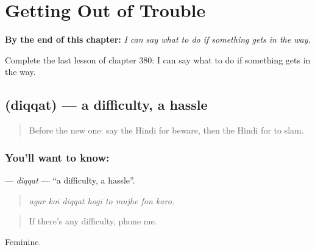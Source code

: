 
\chapter{Getting Out of Trouble}
\label{ch:hi-getting-out-of-trouble}

\begin{chapteropening}
\textbf{By the end of this chapter:} \emph{I can say what to do if something gets in the way.}

Complete the last lesson of chapter 380: I can say what to do if something gets in the way.
\end{chapteropening}

\section[\texorpdfstring{\hi{दिक़्क़त} (diqqat)}{दिक़्क़त (diqqat)}]{ (diqqat) — a difficulty, a hassle}

\label{lesson:HI-C380-diqqat}



\begin{quote}
Before the new one: say the Hindi for beware, then the Hindi for to slam.
\end{quote}

\subsection*{You'll want to know: }
\textbf{} — \emph{diqqat} — \textquotedblleft{}a difficulty, a hassle\textquotedblright{}.

\begin{quote}
       
\end{quote}

\begin{quote}
\emph{agar koī diqqat hogī to mujhe fon karo.}
\end{quote}

\begin{quote}
If there's any difficulty, phone me.
\end{quote}

Feminine.

